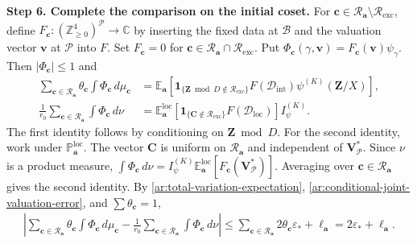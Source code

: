 \documentclass[twoside]{aomart}
\makeatletter
\theoremstyle{paperplain}
\theoremstyle{paperdefinition}
\renewenvironment{proof}[1][\proofname]{\par\pushQED{\qed}%
  \normalfont\topsep6\p@\@plus3\p@\relax\trivlist
  \item[\hskip\labelsep\itshape #1\@addpunct{.}]\ignorespaces
}{\popQED\endtrivlist\@endpefalse}
\newcommand{\E}{\mathbb E}
\newcommand{\Z}{\mathbb Z}
\newcommand{\C}{\mathbb C}
\newcommand{\Pp}{\mathbb P}
\numberwithin{equation}{section}
\makeatother
\begin{document}
\begin{proof}
\par
\medskip
\noindent\textbf{Step 6. Complete the comparison on the initial coset.}
For $\mathbf c\in\mathcal R_{\mathbf a}\setminus\mathcal R_{\mathrm{exc}}$,
define $F_{\mathbf c}:(\Z_{\ge0}^4)^{\mathcal P}\to\C$
by inserting the fixed data at
$\mathcal B$ and the valuation vector $\mathbf v$ at $\mathcal P$
into $F$. Set $F_{\mathbf c}=0$ for
$\mathbf c\in\mathcal R_{\mathbf a}\cap\mathcal R_{\mathrm{exc}}$.
Put $\Phi_{\mathbf c}(\gamma,\mathbf v)
=F_{\mathbf c}(\mathbf v)\psi_\gamma$.
Then $|\Phi_{\mathbf c}|\le1$ and
\begin{equation}
 \begin{aligned}
 \sum_{\mathbf c\in\mathcal R_{\mathbf a}}\theta_{\mathbf c}
       \int\Phi_{\mathbf c}\,d\mu_{\mathbf c}
 &=\E_{\mathbf a}\!\left[
    \mathbf1_{\{\mathbf Z\bmod D\notin\mathcal R_{\mathrm{exc}}\}}
    F(\mathcal D_{\mathrm{int}})\psi^{(K)}(\mathbf Z/X)\right],\\
 \frac1{r_0}\sum_{\mathbf c\in\mathcal R_{\mathbf a}}
       \int\Phi_{\mathbf c}\,d\nu
 &=\E^{\mathrm{loc}}_{\mathbf a}\!\left[
    \mathbf1_{\{\mathbf C\notin\mathcal R_{\mathrm{exc}}\}}
    F(\mathcal D_{\mathrm{loc}})\right]I_\psi^{(K)}.
 \end{aligned}
 \label{ar:matching-truncated-identities}
\end{equation}
The first identity follows by conditioning on $\mathbf Z\bmod D$.
For the second identity, work under $\Pp^{\mathrm{loc}}_{\mathbf a}$.
The vector $\mathbf C$ is uniform on $\mathcal R_{\mathbf a}$ and
independent of $\mathbf V^*_{\mathcal P}$.
Since $\nu$ is a product measure,
$\int\Phi_{\mathbf c}\,d\nu
=I_\psi^{(K)}\E^{\mathrm{loc}}_{\mathbf a}
[F_{\mathbf c}(\mathbf V^*_{\mathcal P})]$.
Averaging over $\mathbf c\in\mathcal R_{\mathbf a}$ gives the second identity.
By \eqref{ar:total-variation-expectation},
\eqref{ar:conditional-joint-valuation-error}, and $\sum\theta_{\mathbf c}=1$,
\begin{equation}
 \begin{aligned}
 \left|\sum_{\mathbf c\in\mathcal R_{\mathbf a}}\theta_{\mathbf c}
       \int\Phi_{\mathbf c}\,d\mu_{\mathbf c}
 -\frac1{r_0}\sum_{\mathbf c\in\mathcal R_{\mathbf a}}
       \int\Phi_{\mathbf c}\,d\nu\right|
 \le\sum_{\mathbf c\in\mathcal R_{\mathbf a}}
             2\theta_{\mathbf c}\varepsilon_*+\ell_{\mathbf a}
 =2\varepsilon_*+\ell_{\mathbf a}.
 \end{aligned}
 \label{ar:matching-averaged-tv}
\end{equation}


\end{proof}
\end{document}
